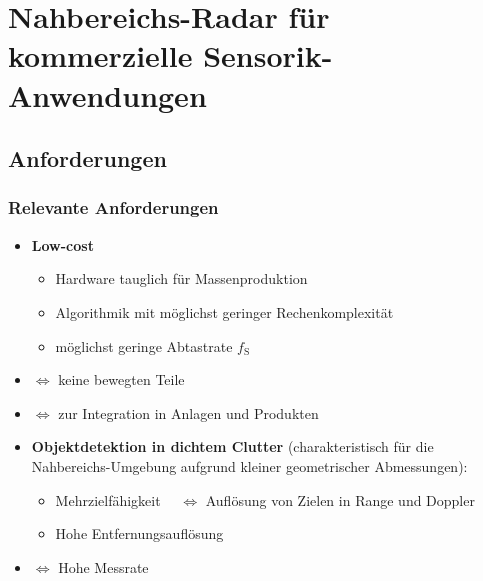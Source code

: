 \documentclass[16pt]{beamer}
\let\svpar\par
\let\svitemize\itemize
\let\svenditemize\enditemize
\let\svitem\item
\def\newpar{\def\par{\svpar\vfill}}
\def\newitem{\def\item{\vfill\svitem}}
\let\svcenter\center
\let\svendcenter\endcenter
\let\svcolumn\column
\let\svendcolumn\endcolumn
\newlength\columnskip
\def\newcolumn{%
	\renewenvironment{column}[2]%
	{\svcolumn{##1}\setlength{\parskip}{\columnskip}##2}%
	{\svendcolumn\vspace{\columnskip}}}
\newcommand\stretchy{\only<1>{%
		\newpar\def\item{\svitem\newitem}%
		\renewenvironment{itemize}{\svitemize}{\svenditemize\newpar\par}%
		\renewenvironment{center}{\svcenter\newpar}{\svendcenter\newpar}%
		\newcolumn
	}}
\begin{document}
\section{Nahbereichs-Radar für kommerzielle Sensorik-Anwendungen}

\frame{\sectionpage}

\subsection{Anforderungen}
\begin{frame}
\frametitle{Relevante Anforderungen}
\stretchy
\begin{itemize}
	\item \textbf{Low-cost}
		\begin{itemize}
			\item Hardware tauglich für Massenproduktion 
			\item Algorithmik mit möglichst geringer Rechenkomplexität 
			\item möglichst geringe Abtastrate $f_{\mathrm{S}}$
		\end{itemize}
	\item{ $\Leftrightarrow$ keine bewegten Teile}
	\item{ $\Leftrightarrow$ zur Integration in Anlagen und Produkten}
	\item \textbf{Objektdetektion in dichtem Clutter} (charakteristisch für die Nahbereichs-Umgebung aufgrund kleiner geometrischer Abmessungen): 
		\begin{itemize}
			\item Mehrzielfähigkeit $\quad\Leftrightarrow$ Auflösung von Zielen in Range und Doppler
			\item Hohe Entfernungsauflösung
		\end{itemize} 
	\item{ $\Leftrightarrow$ Hohe Messrate}
\end{itemize}
\end{frame} 
\end{document}
